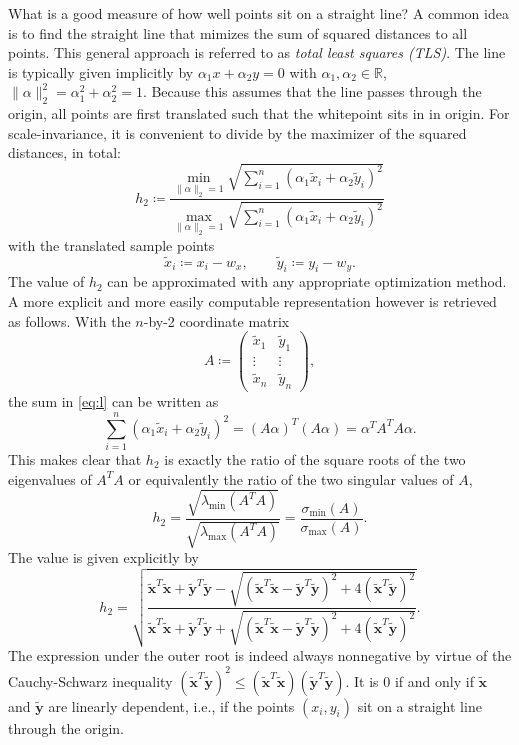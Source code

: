 \documentclass{scrartcl}
\theoremstyle{named}
\newcommand\R{\ensuremath{\mathbb{R}}}
\newcommand\xt{\ensuremath{\bm{\tilde{x}}}}
\newcommand\yt{\ensuremath{\bm{\tilde{y}}}}
\begin{document}
What is a good measure of how well points sit on a straight line?
A common idea is to find the straight line that mimizes the sum of squared distances to
all points. This general approach is referred to as \emph{total least squares (TLS)}.
The line is typically
given implicitly by $\alpha_1 x + \alpha_2 y
= 0$ with $\alpha_1,\alpha_2\in\R$, $\|\alpha\|_2^2 = \alpha_1^2 + \alpha_2^2 = 1$.
Because this assumes that the line passes through the origin, all points are
first translated such that the whitepoint sits in in origin.
For scale-invariance, it is convenient to divide by the maximizer of the squared
distances, in total:
\begin{equation}\label{eq:l}
h_2 \coloneqq
  \frac{
\min_{\|\alpha\|_2=1}
  \sqrt{\sum_{i=1}^n (\alpha_1 \tilde{x}_i + \alpha_2 \tilde{y}_i)^2}
}{
\max_{\|\alpha\|_2=1}
  \sqrt{\sum_{i=1}^n (\alpha_1 \tilde{x}_i + \alpha_2 \tilde{y}_i)^2}
}
\end{equation}
with the translated sample points
\[
  \tilde{x}_i \coloneqq x_i-w_x,\qquad
  \tilde{y}_i \coloneqq y_i-w_y.
\]
The value of $h_2$ can be approximated with any appropriate optimization method. A more
explicit and more easily computable representation however is retrieved as follows.
With the $n$-by-2 coordinate matrix
\[
  A \coloneqq \begin{pmatrix}
    \tilde{x}_1 & \tilde{y}_1\\
    \vdots & \vdots\\
    \tilde{x}_n & \tilde{y}_n
  \end{pmatrix},
\]
the sum in \eqref{eq:l} can be written as
\[
  \sum_{i=1}^n (\alpha_1 \tilde{x}_i + \alpha_2 \tilde{y}_i)^2
  = (A \alpha)^T (A \alpha)
  = \alpha^T A^T A \alpha.
\]
This makes clear that $h_2$ is exactly the ratio of the square roots of the two
eigenvalues of $A^TA$ or equivalently the ratio of the two singular values of $A$,
\[
h_2
= \frac{
  \sqrt{\lambda_{\min}(A^T A)}
  }{
    \sqrt{\lambda_{\max}(A^T A)}
  }
= \frac{\sigma_{\min}(A)}{\sigma_{\max}(A)}.
\]
The value is given explicitly by
\begin{equation*}
  h_2 = \sqrt{
    \frac{
      \xt^T\xt
      + \yt^T\yt
      - \sqrt{(\xt^T\xt - \yt^T\yt)^2 + 4 (\xt^T\yt)^2}
    }{
      \xt^T\xt
      + \yt^T\yt
      + \sqrt{(\xt^T\xt - \yt^T\yt)^2 + 4 (\xt^T\yt)^2}
    }
    }.
\end{equation*}
The expression under the outer root is indeed always nonnegative by virtue of the
Cauchy-Schwarz inequality $(\xt^T\yt)^2 \le (\xt^T\xt) (\yt^T\yt)$. It is 0 if and only
if $\xt$ and $\yt$ are linearly dependent, i.e., if the points $(x_i, y_i)$ sit on a
straight line through the origin.
\end{document}
